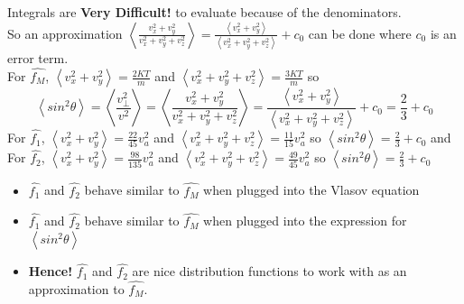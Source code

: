 \documentclass{beamer}
\begin{document}
	\begin{frame}
		Integrals are \textbf{Very Difficult!} to evaluate because of the denominators. \\
		\noindent So an approximation $\left\langle \frac{\displaystyle v_{x}^{2} + v_{y}^{2}}{\displaystyle v_{x}^{2} + v_{y}^{2} +  v_{z}^{2}}\right\rangle =  \frac{\displaystyle \left\langle v_{x}^{2} + v_{y}^{2}\right\rangle}  {\displaystyle \left\langle v_{x}^{2} + v_{y}^{2} +  v_{z}^{2}\right\rangle} + c_{0}$ can be done where $c_{0}$ is an error term.\\
		
		\noindent For $\widehat{f_{M}}$, $\displaystyle \left\langle v_{x}^{2} + v_{y}^{2}\right\rangle = \frac{\displaystyle 2 K T}{\displaystyle m}$ and $\left\langle v_{x}^{2} + v_{y}^{2} +  v_{z}^{2}\right\rangle = \frac{\displaystyle 3 K T}{\displaystyle m}$ so $$\left\langle sin^{2}\theta\right\rangle = \left\langle \frac{\displaystyle v_{\perp}^{2}}{\displaystyle v^{2}}\right\rangle = \left\langle \frac{\displaystyle v_{x}^{2} + v_{y}^{2}}{\displaystyle v_{x}^{2} + v_{y}^{2} +  v_{z}^{2}}\right\rangle = \frac{\displaystyle \left\langle v_{x}^{2} + v_{y}^{2}\right\rangle}  {\displaystyle \left\langle v_{x}^{2} + v_{y}^{2} +  v_{z}^{2}\right\rangle} + c_{0} = \frac{2}{3} + c_{0}$$
		For $\hat{f_{1}}$, $\displaystyle \left\langle v_{x}^{2} + v_{y}^{2}\right\rangle = \frac{22}{45} v_{a}^2$ and $\displaystyle \left\langle v_{x}^{2} + v_{y}^{2} +  v_{z}^{2}\right\rangle = \frac{11}{15} v_{a}^2$ so $\displaystyle \left\langle sin^{2}\theta\right\rangle = \frac{2}{3} + c_{0}$ and \vspace{0.2cm} \\
		\noindent For $\hat{f_{2}}$, $\displaystyle \left\langle v_{x}^{2} + v_{y}^{2}\right\rangle = \frac{98}{135} v_{a}^2$ and $\displaystyle \left\langle v_{x}^{2} + v_{y}^{2} +  v_{z}^{2}\right\rangle = \frac{49}{45} v_{a}^2$ so $\displaystyle \left\langle sin^{2}\theta\right\rangle = \frac{2}{3} + c_{0}$ \\
		
	\end{frame}

	\begin{frame}
		\noindent 
		\begin{itemize}
			\item $\hat{f_{1}}$ and $\hat{f_{2}}$ behave similar to $\widehat{f_{M}}$ when plugged into the Vlasov equation
			\item $\hat{f_{1}}$ and $\hat{f_{2}}$ behave similar to $\widehat{f_{M}}$ when plugged into the expression for $\left\langle sin^{2}\theta\right\rangle$
			\item \textbf{Hence!} $\hat{f_{1}}$ and $\hat{f_{2}}$ are nice distribution functions to work with as an approximation to $\widehat{f_{M}}$.
	\end{itemize}
	\end{frame}
\end{document}
